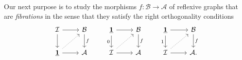 Our next purpose is to study the morphisms $f:\mathcal{B}\to\mathcal{A}$ of reflexive graphs that are \emph{fibrations} in the sense that they satisfy the right orthogonality conditions
\begin{equation*}
\begin{tikzcd}
\mathcal{I} \arrow[r] \arrow[d] & \mathcal{B} \arrow[d,"f"] & \unit \arrow[d,swap,"0"] \arrow[r] & \mathcal{B} \arrow[d,"f"] & \unit \arrow[d,swap,"1"] \arrow[r] & \mathcal{B} \arrow[d,"f"] \\
\unit \arrow[ur,densely dotted] \arrow[r] & \mathcal{A} & \mathcal{I} \arrow[ur,densely dotted] \arrow[r] & \mathcal{A} & \mathcal{I} \arrow[ur,densely dotted] \arrow[r] & \mathcal{A}.
\end{tikzcd}
\end{equation*}

